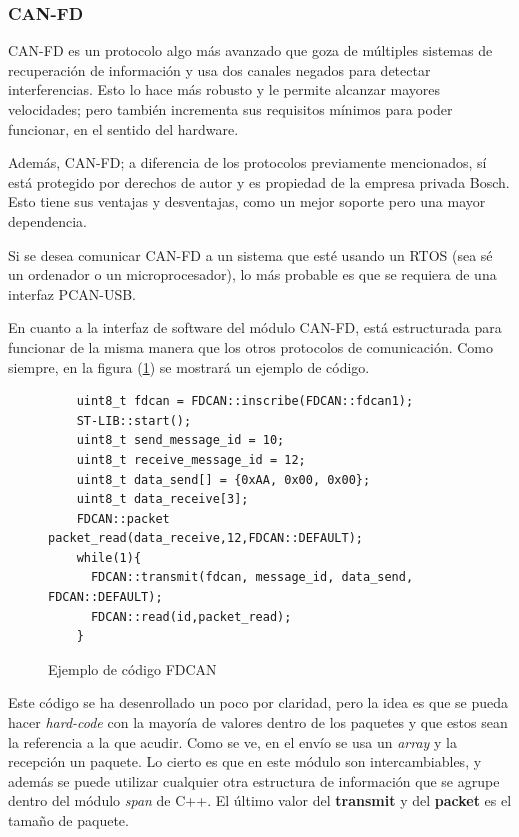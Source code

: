 \documentclass{report}
\begin{document}
\subsubsection{CAN-FD}
CAN-FD\cite{web:CANFD:CiA} es un protocolo algo más avanzado que goza de múltiples sistemas de recuperación de información y usa dos canales negados para detectar interferencias. Esto lo hace más robusto y le permite alcanzar mayores velocidades; pero también incrementa sus requisitos mínimos para poder funcionar, en el sentido del hardware. 
\par 
Además, CAN-FD; a diferencia de los protocolos previamente mencionados, sí está protegido por derechos de autor y es propiedad de la empresa privada Bosch. Esto tiene sus ventajas y desventajas, como un mejor soporte pero una mayor dependencia. 
\par \vspace{0.3cm}
Si se desea comunicar CAN-FD a un sistema que esté usando un RTOS (sea sé un ordenador o un microprocesador), lo más probable es que se requiera de una interfaz PCAN-USB. 
\par \vspace{0.3cm}
En cuanto a la interfaz de software del módulo CAN-FD, está estructurada para funcionar de la misma manera que los otros protocolos de comunicación. Como siempre, en la figura (\ref{FDCANcode}) se mostrará un ejemplo de código. 

\begin{figure}[h]
  \begin{lstlisting}
    uint8_t fdcan = FDCAN::inscribe(FDCAN::fdcan1);
    ST-LIB::start();
    uint8_t send_message_id = 10;
    uint8_t receive_message_id = 12;
    uint8_t data_send[] = {0xAA, 0x00, 0x00}; 
    uint8_t data_receive[3]; 
    FDCAN::packet packet_read(data_receive,12,FDCAN::DEFAULT);
    while(1){
      FDCAN::transmit(fdcan, message_id, data_send, FDCAN::DEFAULT);
      FDCAN::read(id,packet_read);
    }
  \end{lstlisting}
  \caption{Ejemplo de código FDCAN}
  \label{FDCANcode}
  \end{figure}

Este código se ha desenrollado un poco por claridad, pero la idea es que se pueda hacer \textit{hard-code} con la mayoría de valores dentro de los paquetes y que estos sean la referencia a la que acudir. Como se ve, en el envío se usa un \textit{array} y la recepción un paquete. Lo cierto es que en este módulo son intercambiables, y además se puede utilizar cualquier otra estructura de información que se agrupe dentro del módulo \textit{span} de C++. El último valor del \textbf{transmit} y del \textbf{packet} es el tamaño de paquete. 
\end{document}

